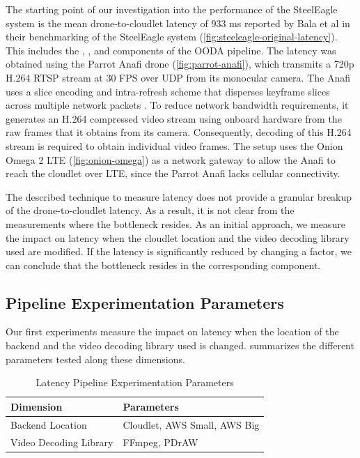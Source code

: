 The starting point of our investigation into the performance of the SteelEagle
system is the mean drone-to-cloudlet latency of 933 ms reported by Bala et al
in their benchmarking of the SteelEagle system
(\cref{fig:steeleagle-original-latency}). This includes the \observeab,
\observec, and {\orientdecide} components of the OODA pipeline.  The latency was
obtained using the Parrot Anafi drone (\cref{fig:parrot-anafi}), which
transmits a 720p H.264 RTSP stream at 30 FPS over UDP from its monocular
camera.  The Anafi uses a slice encoding and intra-refresh scheme that
disperses keyframe slices across multiple network packets
\cite{anafi_white_paper}. To reduce network bandwidth requirements, it
generates an H.264 compressed video stream using onboard hardware from the raw
frames that it obtains from its camera. Consequently, decoding of this H.264
stream is required to obtain individual video frames.  The setup uses the Onion
Omega 2 LTE (\cref{fig:onion-omega}) as a network gateway to allow the Anafi to
reach the cloudlet over LTE, since the Parrot Anafi lacks cellular
connectivity.

The described technique to measure latency does not provide a granular breakup
of the drone-to-cloudlet latency. As a result, it is not clear from the
measurements where the bottleneck resides. As an initial approach, we measure
the impact on latency when the cloudlet location and the video decoding library
used are modified. If the latency is significantly reduced by changing a
factor, we can conclude that the bottleneck resides in the corresponding
component.

\subsection{Pipeline Experimentation Parameters}

Our first experiments measure the impact on latency when the location of the
backend and the video decoding library used is changed. 
summarizes the different parameters tested along these dimensions.
\begin{table}[htbp]
    \centering
    \caption{Latency Pipeline Experimentation Parameters}
    \label{tab:experiment-parameters}
    \begin{tabular}{@{}ll@{}}
        \toprule
        \textbf{Dimension} & \textbf{Parameters} \\ \midrule
        Backend Location & Cloudlet, AWS Small, AWS Big \\
        Video Decoding Library & FFmpeg, PDrAW \\ \bottomrule
    \end{tabular}
\end{table}

